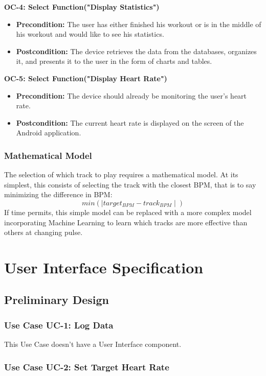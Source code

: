 \documentclass[letterpaper,english, 12pt]{scrreprt}
\begin{document}
{\bf OC-4: Select Function("Display Statistics")}
\begin{itemize}
        \item {\bf Precondition: } The user has either finished his workout or is in the middle of his workout and would like to see his statistics.
        \item {\bf Postcondition: } The device retrieves the data from the databases, organizes it, and presents it to the user in the form of charts and tables.
\end{itemize}

{\bf OC-5: Select Function("Display Heart Rate")}
\begin{itemize}
        \item {\bf Precondition: } The device should already be monitoring the user's heart rate.
        \item {\bf Postcondition: } The current heart rate is displayed on the screen of the Android application.
\end{itemize}


\subsection{Mathematical Model}
The selection of which track to play requires a mathematical model. At its simplest, this consists of selecting the track with the closest BPM, that is to say minimizing the difference in BPM:
\begin{equation}
  min(\mid target_{BPM} - track_{BPM} \mid)
\end{equation}
If time permits, this simple model can be replaced with a more complex model incorporating Machine Learning to learn which tracks are more effective than others at changing pulse.

\chapter{User Interface Specification}
\section{Preliminary Design}

\subsection{Use Case UC-1: Log Data}
This Use Case doesn't have a User Interface component.

\subsection{Use Case UC-2: Set Target Heart Rate}
\end{document}
